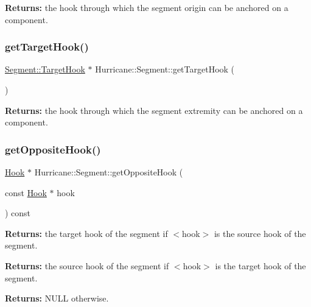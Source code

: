 {\bfseries Returns\+:} the hook through which the segment origin can be anchored on a component. \mbox{\label{classHurricane_1_1Segment_a0fe6cd20516eca2a0b5639ab886bd831}} 
\subsubsection{\texorpdfstring{get\+Target\+Hook()}{getTargetHook()}}
{\footnotesize\ttfamily \mbox{\hyperlink{classHurricane_1_1Segment_1_1TargetHook}{Segment\+::\+Target\+Hook}} $\ast$ Hurricane\+::\+Segment\+::get\+Target\+Hook (\begin{DoxyParamCaption}{ }\end{DoxyParamCaption})\hspace{0.3cm}{\ttfamily [inline]}}

{\bfseries Returns\+:} the hook through which the segment extremity can be anchored on a component. \mbox{\label{classHurricane_1_1Segment_afcd8471a2f2cfaa0e8e78a84ff7c09fc}} 
\subsubsection{\texorpdfstring{get\+Opposite\+Hook()}{getOppositeHook()}}
{\footnotesize\ttfamily \mbox{\hyperlink{classHurricane_1_1Hook}{Hook}} $\ast$ Hurricane\+::\+Segment\+::get\+Opposite\+Hook (\begin{DoxyParamCaption}\item[{const \mbox{\hyperlink{classHurricane_1_1Hook}{Hook}} $\ast$}]{hook }\end{DoxyParamCaption}) const}

{\bfseries Returns\+:} the target hook of the segment if {\ttfamily $<$hook$>$} is the source hook of the segment.

{\bfseries Returns\+:} the source hook of the segment if {\ttfamily $<$hook$>$} is the target hook of the segment.

{\bfseries Returns\+:} N\+U\+LL otherwise. \mbox{\label{classHurricane_1_1Segment_aaa8954fc5948f2a881cdbc9213f9f7a9}} 
